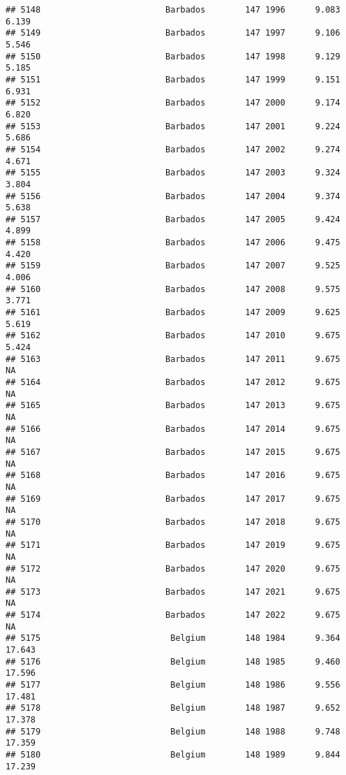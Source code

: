 \documentclass[
]{article}
\begin{document}
\begin{verbatim}
## 5148                         Barbados        147 1996      9.083      6.139
## 5149                         Barbados        147 1997      9.106      5.546
## 5150                         Barbados        147 1998      9.129      5.185
## 5151                         Barbados        147 1999      9.151      6.931
## 5152                         Barbados        147 2000      9.174      6.820
## 5153                         Barbados        147 2001      9.224      5.686
## 5154                         Barbados        147 2002      9.274      4.671
## 5155                         Barbados        147 2003      9.324      3.804
## 5156                         Barbados        147 2004      9.374      5.638
## 5157                         Barbados        147 2005      9.424      4.899
## 5158                         Barbados        147 2006      9.475      4.420
## 5159                         Barbados        147 2007      9.525      4.006
## 5160                         Barbados        147 2008      9.575      3.771
## 5161                         Barbados        147 2009      9.625      5.619
## 5162                         Barbados        147 2010      9.675      5.424
## 5163                         Barbados        147 2011      9.675         NA
## 5164                         Barbados        147 2012      9.675         NA
## 5165                         Barbados        147 2013      9.675         NA
## 5166                         Barbados        147 2014      9.675         NA
## 5167                         Barbados        147 2015      9.675         NA
## 5168                         Barbados        147 2016      9.675         NA
## 5169                         Barbados        147 2017      9.675         NA
## 5170                         Barbados        147 2018      9.675         NA
## 5171                         Barbados        147 2019      9.675         NA
## 5172                         Barbados        147 2020      9.675         NA
## 5173                         Barbados        147 2021      9.675         NA
## 5174                         Barbados        147 2022      9.675         NA
## 5175                          Belgium        148 1984      9.364     17.643
## 5176                          Belgium        148 1985      9.460     17.596
## 5177                          Belgium        148 1986      9.556     17.481
## 5178                          Belgium        148 1987      9.652     17.378
## 5179                          Belgium        148 1988      9.748     17.359
## 5180                          Belgium        148 1989      9.844     17.239

\end{verbatim}
\end{document}
